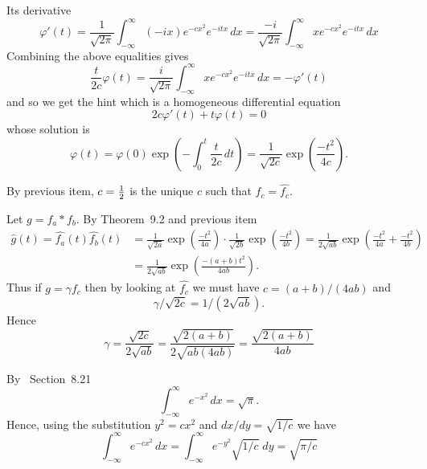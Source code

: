 \begin{enumerate}
\begin{itemize}
Its derivative
\begin{equation*}
\varphi'(t) 
= \frac{1}{\sqrt{2\pi}} \int_{-\infty}^\infty (-ix)e^{-cx^2}e^{-itx}\,dx
= \frac{-i}{\sqrt{2\pi}} \int_{-\infty}^\infty xe^{-cx^2}e^{-itx}\,dx
\end{equation*}
Combining the above equalities gives
\begin{equation*}
\frac{t}{2c}\varphi(t)
= \frac{i}{\sqrt{2\pi}} \int_{-\infty}^\infty xe^{-cx^2}e^{-itx}\,dx
= -\varphi'(t) 
\end{equation*}
and so we get the hint which is a homogeneous differential equation
\begin{equation*}
2c\varphi'(t) + t\varphi(t) = 0
\end{equation*}
whose solution is
\begin{equation*}
\varphi(t) 
= \varphi(0)\exp\left(-\int_0^t\frac{t}{2c}\,dt\right)
= \frac{1}{\sqrt{2c}}\exp\left(\frac{-t^2}{4c}\right).
\end{equation*}

By previous item,
\(c=\frac{1}{2}\) is the unique $c$ such that \(f_c = \widehat{f_c}\).

Let \(g = f_a \ast f_b\). By Theorem~9.2 and previous item
\begin{align*}
\widehat{g}(t) 
= \widehat{f_a}(t)\widehat{f_b}(t)
&= \frac{1}{\sqrt{2a}}\exp\left(\frac{-t^2}{4a}\right) \cdot
  \frac{1}{\sqrt{2b}}\exp\left(\frac{-t^2}{4b}\right)
= \frac{1}{2\sqrt{ab}} \exp\left(\frac{-t^2}{4a}+\frac{-t^2}{4b}\right) \\
&= \frac{1}{2\sqrt{ab}} \exp\left(\frac{-(a+b)t^2}{4ab}\right).
\end{align*}
Thus if \(g = \gamma f_c\) then by looking at \(\widehat{f_c}\) 
we must have
\(c = (a+b)/(4ab)\) and 
\begin{equation*}
\gamma / \sqrt{2c} = 1/(2\sqrt{ab}).
\end{equation*}
Hence
\begin{equation*}
\gamma 
= \frac{\sqrt{2c}}{2\sqrt{ab}}
= \frac{\sqrt{2(a+b)}}{2\sqrt{ab(4ab)}}
= \frac{\sqrt{2(a+b)}}{4ab}
\end{equation*}
 
By \cite{RudinPMA85}~Section~8.21
\begin{equation*}
\int_{-\infty}^\infty e^{-x^2}\,dx = \sqrt{\pi}.
\end{equation*}
Hence, using the substitution \(y^2=cx^2\) and \(dx/dy=\sqrt{1/c}\) 
we have
\begin{equation*}
  \int_{-\infty}^\infty e^{-cx^2}\,dx 
= \int_{-\infty}^\infty e^{-y^2}\sqrt{1/c}\;dy = \sqrt{\pi/c}
\end{equation*}


\end{itemize}
\end{enumerate}
